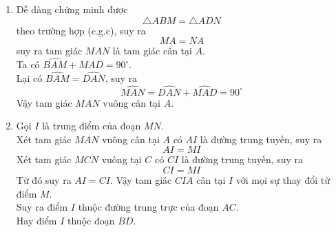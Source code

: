 \begin{bt}
{\begin{enumerate}
Mặt khác, $\widehat{ABC}=90^\circ$. Vậy $ABCD$ là hình vuông.
	\item Dễ dàng chứng minh được
\[\triangle{ABM} = \triangle{ADN}\]
theo trường hợp (c.g.c), suy ra
\[MA = NA\]
suy ra tam giác $MAN$ là tam giác cân tại $A$.\\
Ta có $\widehat{BAM} + \widehat{MAD} = 90^\circ$.\\
Lại có $\widehat{BAM} = \widehat{DAN}$, suy ra
\[\widehat{MAN} = \widehat{DAN} + \widehat{MAD} = 90^\circ\]
Vậy tam giác $MAN$ vuông cân tại $A$.
	\item Gọi $I$ là trung điểm của đoạn $MN$.\\
	Xét tam giác $MAN$ vuông cân tại $A$ có $AI$ là đường trung tuyến, suy ra
	\[AI = MI\]
	Xét tam giác $MCN$ vuông tại $C$ có $CI$ là đường trung tuyến, suy ra
	\[CI = MI\]
	Từ đó suy ra $AI = CI$. Vậy tam giác $CIA$ cân tại $I$ với mọi sự thay đổi từ điểm $M$.\\
	Suy ra điểm $I$ thuộc đường trung trực của đoạn $AC$.\\
	Hay điểm $I$ thuộc đoạn $BD$.
\end{enumerate}
}
\end{bt}
